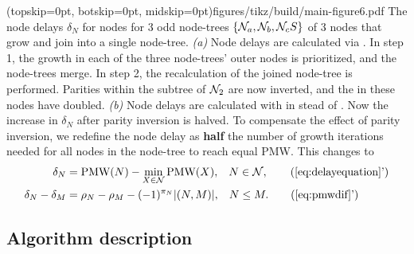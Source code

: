\Figure[hbt!](topskip=0pt, botskip=0pt, midskip=0pt){figures/tikz/build/main-figure6.pdf}{
    The node delays $\delta_N$ for nodes for 3 odd node-trees $\{\mathcal{N}_a, \mathcal{N}_b, \mathcal{N}_cS\}$ of 3 nodes that grow and join into a single node-tree. \emph{(a)} Node delays are calculated via . In step 1, the growth in each of the three node-trees' outer nodes is prioritized, and the node-trees merge. In step 2, the recalculation of the joined node-tree is performed. Parities within the subtree of $\mathcal{N}_2$ are now inverted, and the  in these nodes have doubled. \emph{(b)} Node delays are calculated with  in stead of . Now the increase in $\delta_N$ after parity inversion is halved.\label{fig:partialdfs}}
To compensate the effect of parity inversion, we redefine the node delay as \textbf{half} the number of growth iterations needed for all nodes in the node-tree to reach equal PMW. This changes  to 
\begin{align}
    \delta_N &= \text{PMW}(N) - \min_{X\in\nset}{\text{PMW}(X)}, \hspace{.3cm} N \in \nset, \tag{\ref{eq:delayequation}'}  \\
    \delta_N - \delta_M &= \rho_N-\rho_M - (-1)^{\pi_N}\abs{(N,M)}, \hspace{.3cm} N\leq M. \tag{\ref{eq:pmwdif}'}\label{eq:pmwdifnew}
\end{align}

\subsection{Algorithm description}\label{sec:pseudocode}

